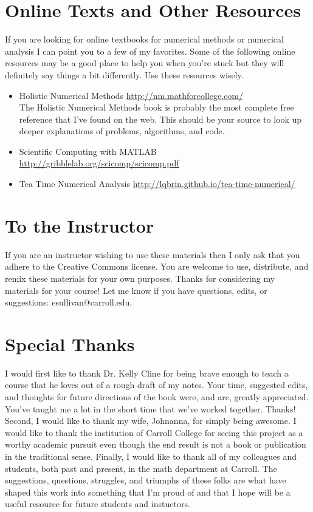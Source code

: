\section{Online Texts and Other Resources}\label{pref:resources}
If you are looking for online textbooks for numerical methods or numerical analysis I can
point you to a few of my favorites.  Some of the following online resources may be a good
place to help you when you're stuck but they will definitely say things a bit differently.
Use these resources wisely.
\begin{itemize}
    \item Holistic Numerical Methods
        \href{http://nm.mathforcollege.com/}{http://nm.mathforcollege.com/}\\
        The Holistic Numerical Methods book is probably the most complete free reference
        that I've found on the web.  This should be your source to look up deeper
        explanations of problems, algorithms, and code.
    \item Scientific Computing with MATLAB
        \href{http://gribblelab.org/scicomp/scicomp.pdf}{http://gribblelab.org/scicomp/scicomp.pdf}
    \item Tea Time Numerical Analysis
        \href{http://lqbrin.github.io/tea-time-numerical/}{http://lqbrin.github.io/tea-time-numerical/}
\end{itemize}


\section{To the Instructor}
If you are an instructor wishing to use these materials then I only ask that you adhere to the
Creative Commons license.  You are welcome to use, distribute, and remix these materials
for your own purposes.  Thanks for considering my materials for your course!  Let me know
if you have questions, edits, or suggestions: esullivan@carroll.edu.


\section{Special Thanks}
I would first like to thank Dr. Kelly Cline for being brave enough to teach a course that
he loves out of a rough draft of my notes.  Your time, suggested edits, and thoughts for
future directions of the book were, and are, greatly appreciated.  You've taught me a lot
in the short time that we've worked together.  Thanks!  Second, I would like to
thank my wife, Johnanna, for simply being awesome.  I would like to thank the institution
of Carroll College for seeing this project as a worthy academic pursuit even though the
end result is not a book or publication in the traditional sense.  Finally, I would like
to thank all of my colleagues and students, both past and present, in the math department
at Carroll.  The suggestions, questions, struggles, and triumphs of these folks are what
have shaped this work into something that I'm proud of and that I hope will be a useful
resource for future students and instuctors.
